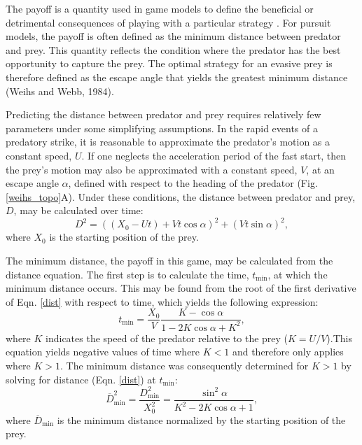 \documentclass[12pt]{article}
\newcommand{\ol}{\overline}
\begin{document}
The payoff is a quantity used in game models to define the beneficial or detrimental consequences of playing with a particular strategy \citep{Webb:2007hg}. For pursuit models, the payoff is often defined as the minimum distance between predator and prey. 
This quantity reflects the condition where the predator has the best opportunity to capture the prey. The optimal strategy for an evasive prey is therefore defined as the escape angle that yields the greatest minimum distance (Weihs and Webb, 1984).

Predicting the distance between predator and prey requires relatively few parameters under some simplifying assumptions. In the rapid events of a predatory strike, it is reasonable to approximate the predator's motion as a constant speed, $U$. 
If one neglects the acceleration period of the fast start, then the prey's motion may also be approximated with a constant speed, $V$, at an escape angle $\alpha$, defined with respect to the heading of the predator (Fig. \ref{weihs_topo}A). Under these conditions, the distance between predator and prey, $D$, may be calculated over time:
%
\begin{equation}
D^2 = ((X_0 - Ut) + Vt\cos\alpha)^2 + (Vt\sin\alpha)^2,
\label{dist}
\end{equation}
%
where $X_0$ is the starting position of the prey.

The minimum distance, the payoff in this game, may be calculated from the distance equation. The first step is to calculate the time, $t_{\text{min}}$,  at which the minimum distance occurs. This may be found from the root of the first derivative of Eqn. \ref{dist} with respect to time, which yields the following expression:
%
\begin{equation}
t_{\text{min}} = \frac{X_0}{V} \frac{K-\cos\alpha}{1-2 K\cos\alpha+K^2},
\label{eq33weihs}	
\end{equation}
%
where $K$ indicates the speed of the predator relative to the prey ($K = U/V$).This equation yields negative values of time where $K<1$ and therefore only applies where $K>1$. The minimum distance was consequently determined for $K>1$ by solving for distance (Eqn. \ref{dist}) at $t_{\text{min}}$:
%
\begin{equation}
\ol D_{\text{min}}^2 = \frac{D_{\text{min}}^2}{X_0^2} = \frac{\sin^2\alpha}{K^2 - 2K \cos\alpha + 1},
\label{dmin}
\end{equation}
where $\ol D_{\text{min}}$ is the minimum distance normalized by the starting position of the prey.
\end{document}
